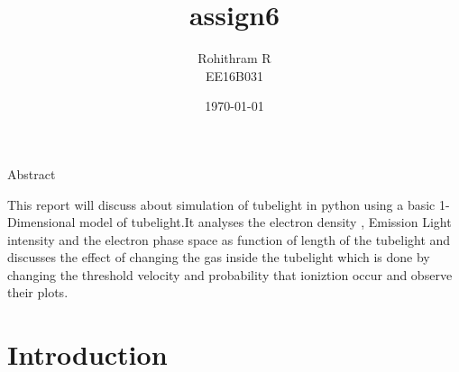 \documentclass[10pt,notitlepage,onecolumn,aps,pra]{revtex4-1}
\begin{document}
    
    
    \title{assign6}\author{Rohithram R \\ EE16B031}

\date{\today}
\maketitle


    
    

    
    Abstract

 This report will discuss about simulation of tubelight in python using
a basic 1-Dimensional model of tubelight.It analyses the electron
density , Emission Light intensity and the electron phase space as
function of length of the tubelight and discusses the effect of changing
the gas inside the tubelight which is done by changing the threshold
velocity and probability that ioniztion occur and observe their plots.

    \section{Introduction}\label{introduction}
\end{document}
